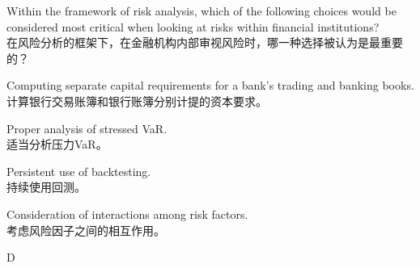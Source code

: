 \documentclass{article}
\newcounter{question} %
\begin{document}
\begin{question}
    Within the framework of risk analysis, which of the following choices would be considered most critical when looking at risks within financial institutions?
    \\在风险分析的框架下，在金融机构内部审视风险时，哪一种选择被认为是最重要的？
\end{question}

\begin{choices}
    \item Computing separate capital requirements for a bank's trading and banking books.\\
        计算银行交易账簿和银行账簿分别计提的资本要求。
    \item Proper analysis of stressed VaR.\\
        适当分析压力VaR。
    \item Persistent use of backtesting.\\
        持续使用回测。
    \item Consideration of interactions among risk factors.\\
        考虑风险因子之间的相互作用。
\end{choices}

\begin{correctanswer}
    D
\end{correctanswer}
\end{document}
